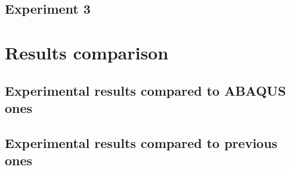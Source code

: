 \subsection{Experiment 3}

\section{Results comparison}

\subsection{Experimental results compared to ABAQUS ones}
\subsection{Experimental results compared to previous ones}
